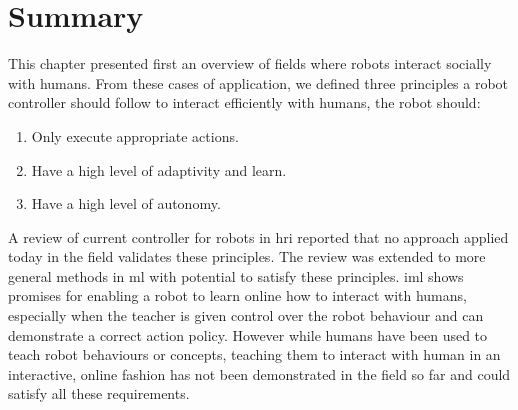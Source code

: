 


\section{Summary}

This chapter presented first an overview of fields where robots interact socially with humans. From these cases of application, we defined three principles a robot controller should follow to interact efficiently with humans, the robot should:
\begin{enumerate}
   	\item Only execute appropriate actions.
   	\item Have a high level of adaptivity and learn.
   	\item Have a high level of autonomy.
\end{enumerate}

A review of current controller for robots in \gls{hri} reported that no approach applied today in the field validates these principles. The review was extended to more general methods in \acrlong{ml} with potential to satisfy these principles. \acrlong{iml} shows promises for enabling a robot to learn online how to interact with humans, especially when the teacher is given control over the robot behaviour and can demonstrate a correct action policy. However while humans have been used to teach robot behaviours or concepts, teaching them to interact with human in an interactive, online fashion has not been demonstrated in the field so far and could satisfy all these requirements.